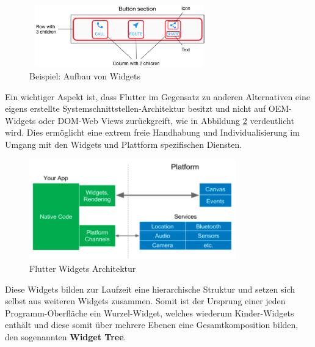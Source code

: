 \documentclass[bibliography=totoc,listof=totoc,BCOR=5mm,DIV=12,oneside]{scrbook}
\begin{document}
\bigskip
\begin{figure}[H]
	\centering
	\includegraphics[width=0.8\textwidth, keepaspectratio]{Bilder/FlutterWidgetButtonSectionExample.png}
	\caption{Beispiel: Aufbau von Widgets  \cite{FlutterBuildingLayouts}}
	\label{img:FlutterWidgetButtonSectionExample}
\end{figure}

\par \medskip Ein wichtiger Aspekt ist, dass Flutter im Gegensatz zu anderen Alternativen eine eigens erstellte Systemschnittstellen-Architektur besitzt und nicht auf OEM-Widgets oder DOM-Web Views zurückgreift\citep{HackernoonFlutterArcticle}, wie in Abbildung \ref{img:hackernoonFlutterArcticleArchitecture} verdeutlicht wird. Dies ermöglicht eine extrem freie Handhabung und Individualisierung im Umgang mit den Widgets und Plattform spezifischen Diensten.

\bigskip
\begin{figure}[H]
	\centering
	\includegraphics[width=0.8\textwidth, keepaspectratio]{Bilder/WidgetsFlutterArchitecture.png}
	\caption{Flutter Widgets Architektur \cite{HackernoonFlutterArcticle}}
	\label{img:hackernoonFlutterArcticleArchitecture}
\end{figure}

\par \bigskip Diese Widgets bilden zur Laufzeit eine hierarchische Struktur und setzen sich selbst aus weiteren Widgets zusammen. Somit ist der Ursprung einer jeden Programm-Oberfläche ein Wurzel-Widget, welches wiederum Kinder-Widgets enthält und diese somit über mehrere Ebenen eine Gesamtkomposition bilden, den sogenannten \textbf{Widget Tree}. 
\end{document}
